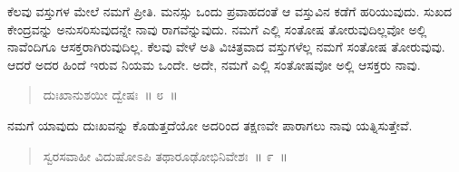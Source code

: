 \vspace{-0.4cm}


\vskip 0.2cm 

ಕೆಲವು ವಸ್ತುಗಳ ಮೇಲೆ ನಮಗೆ ಪ್ರೀತಿ. ಮನಸ್ಸು ಒಂದು ಪ್ರವಾಹದಂತೆ ಆ ವಸ್ತುವಿನ ಕಡೆಗೆ ಹರಿಯುವುದು. ಸುಖದ ಕೇಂದ್ರವನ್ನು ಅನುಸರಿಸುವುದನ್ನೇ ನಾವು ರಾಗವೆನ್ನುವುದು. ನಮಗೆ ಎಲ್ಲಿ ಸಂತೋಷ ತೋರುವುದಿಲ್ಲವೋ ಅಲ್ಲಿ ನಾವೆಂದಿಗೂ ಆಸಕ್ತರಾಗಿರುವುದಿಲ್ಲ. ಕೆಲವು ವೇಳೆ ಅತಿ ವಿಚಿತ್ರವಾದ ವಸ್ತುಗಳೆಲ್ಲ ನಮಗೆ ಸಂತೋಷ ತೋರುವುವು. ಆದರೆ ಅದರ ಹಿಂದೆ ಇರುವ ನಿಯಮ ಒಂದೇ. ಅದೇ, ನಮಗೆ ಎಲ್ಲಿ ಸಂತೋಷವೋ ಅಲ್ಲಿ ಆಸಕ್ತರು ನಾವು. 

\vspace{-0.2cm}

\begin{verse}
ದುಃಖಾನುಶಯೀ ದ್ವೇಷಃ~॥ ೮~॥
\end{verse}

\vspace{-0.4cm}


\vskip 0.2cm 

ನಮಗೆ ಯಾವುದು ದುಃಖವನ್ನು ಕೊಡುತ್ತದೆಯೋ ಅದರಿಂದ ತಕ್ಷಣವೇ ಪಾರಾಗಲು ನಾವು ಯತ್ನಿಸುತ್ತೇವೆ. 

\vskip 0.1cm 

\vspace{-0.2cm}

\begin{verse}
ಸ್ವರಸವಾಹೀ ವಿದುಷೋಽಪಿ ತಥಾರೂಢೋಭಿನಿವೇಶಃ~॥ ೯~॥
\end{verse}

\vspace{-0.4cm}


\vskip 0.2cm 

